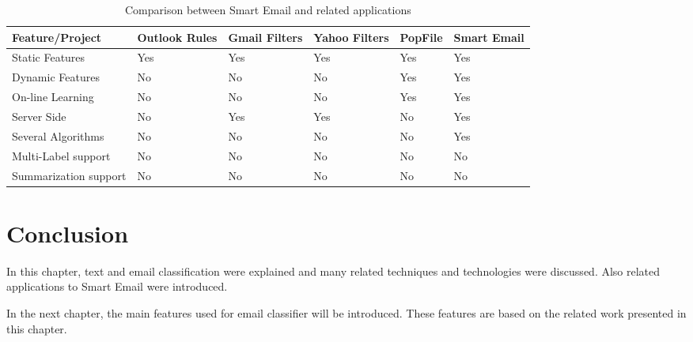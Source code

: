 \begin{center}
    \begin{table}[H]
      \begin{tabular}{ | p{3cm} | p{2cm} | p{2cm} | p{2cm} | p{2cm} | p{2cm} |}
        \hline
        Feature/Project              & Outlook Rules \cite{OUTLOOK_REF} & Gmail Filters \cite{GMAIL_FILTERS} & 
        Yahoo Filters \cite{YAHOO_FILTERS} & PopFile \cite{POPFILE} & Smart Email\\ \hline
        Static Features \cite{YAHOO_FILTERS} \cite{GMAIL_FILTERS}  &    Yes        &    Yes        &    Yes      &    Yes  & \cellcolor[gray]{0.9}Yes \\ \hline     
        Dynamic Features  \cite{Sebastiani2002} \cite{RON04} &    No        &    No         &    No        &    Yes  & \cellcolor[gray]{0.9}Yes  \\ \hline
        On-line Learning \cite{JOSE11} &    No        &    No         &    No        &    Yes  & \cellcolor[gray]{0.9}Yes \\ \hline
        Server Side      &    No        &    Yes        &    Yes       &    No   & \cellcolor[gray]{0.9}Yes\\ \hline
        Several Algorithms \cite{Sebastiani2002} &    No        &    No &    No       &    No   & \cellcolor[gray]{0.9}Yes\\ \hline
        Multi-Label support \cite{sift02} \cite{Carmona2011} &    No        &    No &    No       &    No  & \cellcolor[gray]{0.9}No \\ \hline
        Summarization support&    No        &    No &    No       &    No & \cellcolor[gray]{0.9}No  \\ \hline
      \end{tabular}
      \caption[Comparison between Smart Email and related applications]
      {Comparison between Smart Email and related applications}
    \end{table}
\end{center}  

\section{Conclusion}
\label{sec:conclusion_2}
In this chapter, text and email classification were explained and many related techniques 
and technologies were discussed. Also related applications to Smart Email were introduced.

In the next chapter, the main features used for email classifier will be introduced. 
These features are based on the related work presented in this chapter.


